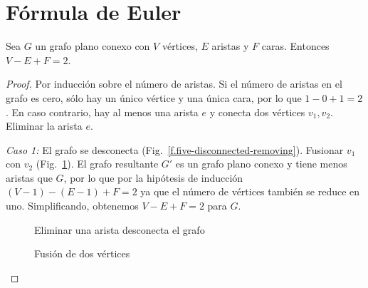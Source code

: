 {{%

\section{Fórmula de Euler}\label{s.euler}

\begin{theorem}\label{thm.euler} Sea $G$ un grafo plano conexo con $V$ vértices, $E$ aristas y $F$ caras. Entonces $V-E+F=2$.
\end{theorem}

\begin{proof}
Por inducción sobre el número de aristas. Si el número de aristas en el grafo es cero, sólo hay un único vértice y una única cara, por lo que $1-0+1=2$. En caso contrario, hay al menos una arista $e$ y conecta dos vértices $v_1,v_2$. Eliminar la arista $e$.

\textit{Caso 1:}
El grafo se desconecta (Fig.~\ref{f.five-disconnected-removing}). Fusionar $v_1$ con $v_2$ (Fig.~\ref{f.five-disconnected-merge}). El grafo resultante $G'$ es un grafo plano conexo y tiene menos aristas que $G$, por lo que por la hipótesis de inducción $(V-1)-(E-1)+F=2$ ya que el número de vértices también se reduce en uno. Simplificando, obtenemos $V-E+F=2$ para $G$.

\begin{figure}[ht]
\begin{minipage}{.45\textwidth}
\begin{center}
\caption{Eliminar una arista desconecta el grafo}\label{f.five-disconnected-removing}
\end{center}
\end{minipage}
\hfill
\begin{minipage}{.45\textwidth}
\begin{center}
\caption{Fusión de dos vértices}\label{f.five-disconnected-merge}
\end{center}
\end{minipage}
\end{figure}


\end{proof}}}
